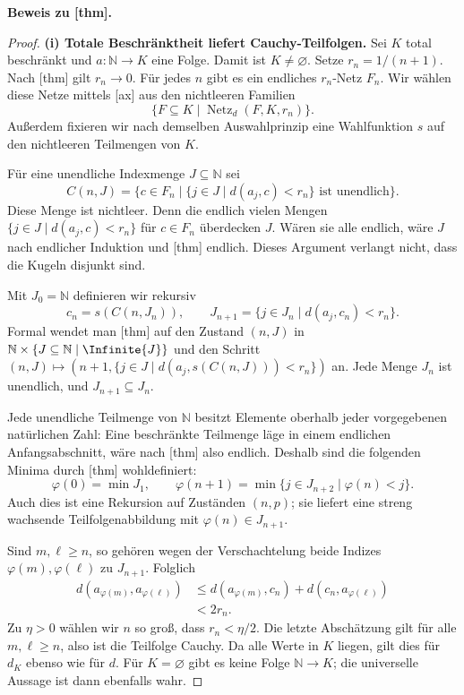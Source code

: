 \noindent\textbf{Beweis zu
[thm].}
\begin{proof}
\noindent\textbf{(i) Totale Beschränktheit liefert Cauchy-Teilfolgen.}
Sei \(K\) total beschränkt und \(a\colon\mathbb N\to K\) eine Folge.
Damit ist \(K\ne\varnothing\). Setze \(r_n=1/(n+1)\).
Nach [thm]
gilt \(r_n\to0\). Für jedes \(n\) gibt es ein endliches
\(r_n\)-Netz \(F_n\). Wir wählen diese Netze mittels
[ax] aus den nichtleeren Familien
\[
 \{F\subseteq K\mid\operatorname{Netz}_d(F,K,r_n)\}.
\]
Außerdem fixieren wir nach demselben Auswahlprinzip eine Wahlfunktion
\(s\) auf den nichtleeren Teilmengen von \(K\).

Für eine unendliche Indexmenge \(J\subseteq\mathbb N\) sei
\[
 C(n,J)=\{c\in F_n\mid
   \{j\in J\mid d(a_j,c)<r_n\}\text{ ist unendlich}\}.
\]
Diese Menge ist nichtleer. Denn die endlich vielen Mengen
\(\{j\in J\mid d(a_j,c)<r_n\}\) für \(c\in F_n\) überdecken \(J\).
Wären sie alle endlich, wäre \(J\) nach endlicher Induktion und
[thm] endlich. Dieses Argument verlangt nicht,
dass die Kugeln disjunkt sind.

Mit \(J_0=\mathbb N\) definieren wir rekursiv
\[
 c_n=s(C(n,J_n)),\qquad
 J_{n+1}=\{j\in J_n\mid d(a_j,c_n)<r_n\}.
\]
Formal wendet man [thm]
auf den Zustand \((n,J)\) in
\(\mathbb N\times\{J\subseteq\mathbb N\mid\Infinite{J}\}\) und den
Schritt \((n,J)\mapsto(n+1,\{j\in J\mid d(a_j,s(C(n,J)))<r_n\})\) an.
Jede Menge \(J_n\) ist unendlich, und \(J_{n+1}\subseteq J_n\).

Jede unendliche Teilmenge von \(\mathbb N\) besitzt Elemente oberhalb
jeder vorgegebenen natürlichen Zahl: Eine beschränkte Teilmenge läge in
einem endlichen Anfangsabschnitt, wäre nach
[thm] also endlich. Deshalb sind die
folgenden Minima durch
[thm] wohldefiniert:
\[
 \varphi(0)=\min J_1,\qquad
 \varphi(n+1)=\min\{j\in J_{n+2}\mid\varphi(n)<j\}.
\]
Auch dies ist eine Rekursion auf Zuständen \((n,p)\); sie liefert eine
streng wachsende Teilfolgenabbildung mit \(\varphi(n)\in J_{n+1}\).

Sind \(m,\ell\geq n\), so gehören wegen der Verschachtelung beide
Indizes \(\varphi(m),\varphi(\ell)\) zu \(J_{n+1}\). Folglich
\[
 \begin{aligned}
 d(a_{\varphi(m)},a_{\varphi(\ell)})
 &\leq d(a_{\varphi(m)},c_n)+d(c_n,a_{\varphi(\ell)})\\
 &<2r_n.
 \end{aligned}
\]
Zu \(\eta>0\) wählen wir \(n\) so groß, dass \(r_n<\eta/2\).
Die letzte Abschätzung gilt für alle \(m,\ell\geq n\), also ist die
Teilfolge Cauchy. Da alle Werte in \(K\) liegen, gilt dies für \(d_K\)
ebenso wie für \(d\). Für \(K=\varnothing\) gibt es keine Folge
\(\mathbb N\to K\); die universelle Aussage ist dann ebenfalls wahr.


\end{proof}
